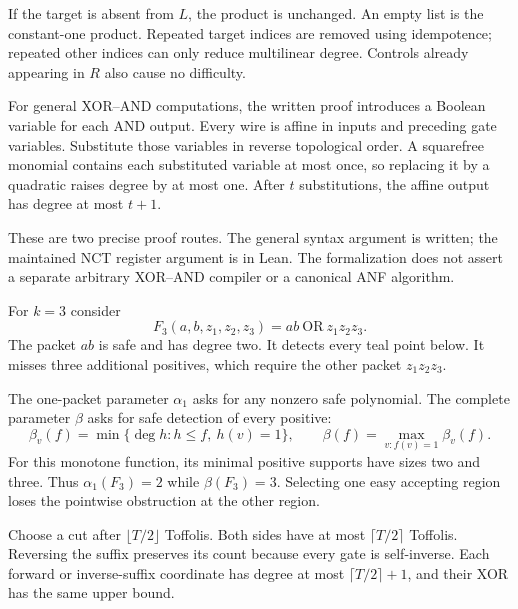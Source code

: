 If the target is absent from $L$, the product is unchanged. An empty list
is the constant-one product. Repeated target indices are removed using
idempotence; repeated other indices can only reduce multilinear degree.
Controls already appearing in $R$ also cause no difficulty.

For general XOR--AND computations, the written proof introduces a Boolean
variable for each AND output. Every wire is affine in inputs and preceding
gate variables. Substitute those variables in reverse topological order.
A squarefree monomial contains each substituted variable at most once,
so replacing it by a quadratic raises degree by at most one. After $t$
substitutions, the affine output has degree at most $t+1$.

These are two precise proof routes. The general syntax argument is written;
the maintained NCT register argument is in Lean. The formalization does not
assert a separate arbitrary XOR--AND compiler or a canonical ANF algorithm.


For $k=3$ consider
\[
 F_3(a,b,z_1,z_2,z_3)=ab\ \mathrm{OR}\ z_1z_2z_3.
\]
The packet $ab$ is safe and has degree two. It detects every teal point
below. It misses three additional positives, which require the other
packet $z_1z_2z_3$.


The one-packet parameter $\alpha_1$ asks for any nonzero safe polynomial.
The complete parameter $\beta$ asks for safe detection of every positive:
\[
 \beta_v(f)=\min\{\deg h:h\le f,\ h(v)=1\},\qquad
 \beta(f)=\max_{v:f(v)=1}\beta_v(f).
\]
For this monotone function, its minimal positive supports have sizes two
and three. Thus $\alpha_1(F_3)=2$ while $\beta(F_3)=3$. Selecting one
easy accepting region loses the pointwise obstruction at the other region.


Choose a cut after $\lfloor T/2\rfloor$ Toffolis. Both sides have at most
$\lceil T/2\rceil$ Toffolis. Reversing the suffix preserves its count because
every gate is self-inverse. Each forward or inverse-suffix coordinate has
degree at most $\lceil T/2\rceil+1$, and their XOR has the same upper bound.

